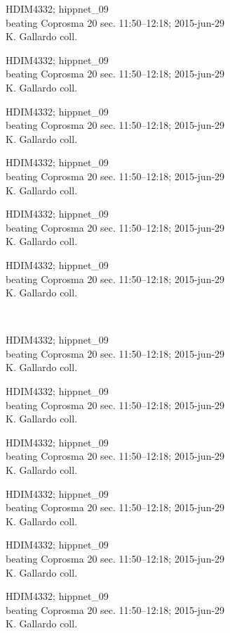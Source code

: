 \documentclass[2pt]{extarticle}
\begin{document}
\noindent
\parbox{0.16\textwidth}{\tiny \raggedright \rule[-0.3\baselineskip]{0pt}{10pt}HDIM4332; hippnet\_09\\ beating Coprosma 20 sec. 11:50--12:18; 2015-jun-29\\ K. Gallardo coll.}
\parbox{0.16\textwidth}{\tiny \raggedright \rule[-0.3\baselineskip]{0pt}{10pt}HDIM4332; hippnet\_09\\ beating Coprosma 20 sec. 11:50--12:18; 2015-jun-29\\ K. Gallardo coll.}
\parbox{0.16\textwidth}{\tiny \raggedright \rule[-0.3\baselineskip]{0pt}{10pt}HDIM4332; hippnet\_09\\ beating Coprosma 20 sec. 11:50--12:18; 2015-jun-29\\ K. Gallardo coll.}
\parbox{0.16\textwidth}{\tiny \raggedright \rule[-0.3\baselineskip]{0pt}{10pt}HDIM4332; hippnet\_09\\ beating Coprosma 20 sec. 11:50--12:18; 2015-jun-29\\ K. Gallardo coll.}
\parbox{0.16\textwidth}{\tiny \raggedright \rule[-0.3\baselineskip]{0pt}{10pt}HDIM4332; hippnet\_09\\ beating Coprosma 20 sec. 11:50--12:18; 2015-jun-29\\ K. Gallardo coll.}
\parbox{0.16\textwidth}{\tiny \raggedright \rule[-0.3\baselineskip]{0pt}{10pt}HDIM4332; hippnet\_09\\ beating Coprosma 20 sec. 11:50--12:18; 2015-jun-29\\ K. Gallardo coll.} \\ 
\vspace{0.001in} 

\noindent
\parbox{0.16\textwidth}{\tiny \raggedright \rule[-0.3\baselineskip]{0pt}{10pt}HDIM4332; hippnet\_09\\ beating Coprosma 20 sec. 11:50--12:18; 2015-jun-29\\ K. Gallardo coll.}
\parbox{0.16\textwidth}{\tiny \raggedright \rule[-0.3\baselineskip]{0pt}{10pt}HDIM4332; hippnet\_09\\ beating Coprosma 20 sec. 11:50--12:18; 2015-jun-29\\ K. Gallardo coll.}
\parbox{0.16\textwidth}{\tiny \raggedright \rule[-0.3\baselineskip]{0pt}{10pt}HDIM4332; hippnet\_09\\ beating Coprosma 20 sec. 11:50--12:18; 2015-jun-29\\ K. Gallardo coll.}
\parbox{0.16\textwidth}{\tiny \raggedright \rule[-0.3\baselineskip]{0pt}{10pt}HDIM4332; hippnet\_09\\ beating Coprosma 20 sec. 11:50--12:18; 2015-jun-29\\ K. Gallardo coll.}
\parbox{0.16\textwidth}{\tiny \raggedright \rule[-0.3\baselineskip]{0pt}{10pt}HDIM4332; hippnet\_09\\ beating Coprosma 20 sec. 11:50--12:18; 2015-jun-29\\ K. Gallardo coll.}
\parbox{0.16\textwidth}{\tiny \raggedright \rule[-0.3\baselineskip]{0pt}{10pt}HDIM4332; hippnet\_09\\ beating Coprosma 20 sec. 11:50--12:18; 2015-jun-29\\ K. Gallardo coll.} \\ 
\vspace{0.001in} 
\end{document}
